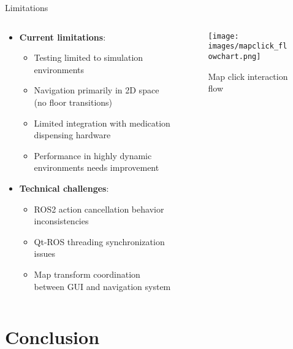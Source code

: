 \documentclass[aspectratio=169]{beamer}
\begin{document}
\begin{frame}{Limitations}
  \begin{columns}
    \begin{column}{0.6\textwidth}
      \begin{itemize}
      \item \textbf{Current limitations}:
        \begin{itemize}
        \item Testing limited to simulation environments
        \item Navigation primarily in 2D space (no floor transitions)
        \item Limited integration with medication dispensing hardware
        \item Performance in highly dynamic environments needs improvement
        \end{itemize}
      \item \textbf{Technical challenges}:
        \begin{itemize}
        \item ROS2 action cancellation behavior inconsistencies
        \item Qt-ROS threading synchronization issues
        \item Map transform coordination between GUI and navigation system
        \end{itemize}
      \end{itemize}
    \end{column}
    \begin{column}{0.4\textwidth}
      \begin{figure}
        \texttt{[image: images/mapclick\_flowchart.png]}
        \caption{Map click interaction flow}
      \end{figure}
    \end{column}
  \end{columns}
\end{frame}

\section{Conclusion}
\end{document}
